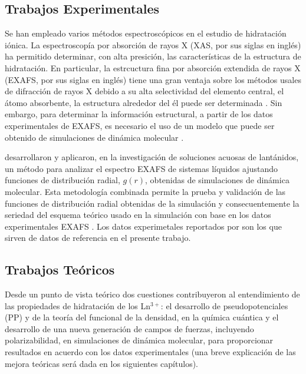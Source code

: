 \subsection{Trabajos Experimentales}
Se han empleado varios m\'etodos espectrosc\'opicos en el estudio de
hidrataci\'on i\'onica. La espectroscop\'ia por absorci\'on de rayos 
X (XAS, por sus siglas en ingl\' es) ha permitido determinar, con 
alta presici\'on, las caracter\'isticas de la estructura de 
hidrataci\'on. En particular, la estrcuctura fina por absorci\'on 
extendida de rayos X (EXAFS, por sus siglas en ingl\'es) tiene una 
gran ventaja sobre los m\'etodos usales de difracci\'on de rayos X 
debido a su alta selectividad del elemento central, el \'atomo 
absorbente, la estructura alrededor del \'el puede ser determinada
\citep{Ohta1993}. Sin embargo, para determinar la informaci\'on 
estructural, a partir de los datos experimentales de EXAFS, es 
necesario el uso de un modelo que puede ser obtenido de simulaciones 
de din\'amica molecular \citep{Dang2011}. 

\cite{Dang2011} desarrollaron y aplicaron, en la investigaci\'on de
soluciones acuosas de lant\'anidos, un m\'etodo para analizar 
el espectro EXAFS de sistemas l\'iquidos ajustando funciones de 
distribuci\'on radial, $g(r)$, obtenidas de simulaciones de 
din\'amica molecular. Esta metodolog\'ia combinada permite la prueba 
y validaci\'on de las funciones de distribuci\'on radial obtenidas de
la simulaci\'on y consecuentemente la seriedad del esquema te\'orico
usado en la simulaci\'on con base en los datos experimentales EXAFS 
\citep{Dang2012}. Los datos experimetales reportados por 
\cite{Dang2011} son los que sirven de datos de referencia en el 
presente trabajo.

\subsection{Trabajos Te\'oricos}
Desde un punto de vista te\'orico dos cuestiones contribuyeron
al entendimiento de las propiedades de hidrataci\'on de los 
Ln$^{3+}$: el desarrollo de pseudopotenciales (PP) y de la teor\'ia 
del funcional de la densidad, en la qu\'imica cu\'antica y el 
desarrollo de una nueva generaci\'on de campos de fuerzas, 
incluyendo polarizabilidad, en simulaciones de din\'amica molecular,
para proporcionar resultados en acuerdo con los datos experimentales
\citep{Dang2012} (una breve explicaci\'on de las mejora te\'oricas 
ser\'a dada en los siguientes cap\'itulos).

